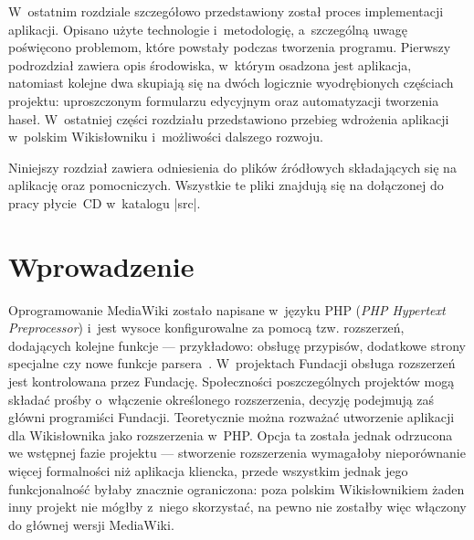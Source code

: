 \label{chap:impl}
W~ostatnim rozdziale szczegółowo przedstawiony został proces implementacji aplikacji. Opisano użyte technologie i~metodologię, a~szczególną uwagę poświęcono problemom, które powstały podczas tworzenia programu. Pierwszy podrozdział zawiera opis środowiska, w~którym osadzona jest aplikacja, natomiast kolejne dwa skupiają się na dwóch logicznie wyodrębionych częściach projektu: uproszczonym formularzu edycyjnym oraz automatyzacji tworzenia haseł. W~ostatniej części rozdziału przedstawiono przebieg wdrożenia aplikacji w~polskim Wikisłowniku i~możliwości dalszego rozwoju.

Niniejszy rozdział zawiera odniesienia do plików źródłowych składających się na aplikację oraz pomocniczych. Wszystkie te pliki znajdują się na dołączonej do pracy płycie~CD w~katalogu \kod|src|.

\section{Wprowadzenie}
Oprogramowanie MediaWiki zostało napisane w~języku PHP (\emph{PHP Hypertext Preprocessor}) i~jest wysoce konfigurowalne za pomocą tzw. rozszerzeń, dodających kolejne funkcje --- przykładowo: obsługę przypisów, dodatkowe strony specjalne czy nowe funkcje parsera~\cite{mw:extensions}. W~projektach Fundacji obsługa rozszerzeń jest kontrolowana przez Fundację. Społeczności poszczególnych projektów mogą składać prośby o~włączenie określonego rozszerzenia, decyzję podejmują zaś główni programiści Fundacji. Teoretycznie można rozważać utworzenie aplikacji dla Wikisłownika jako rozszerzenia w~PHP. Opcja ta została jednak odrzucona we wstępnej fazie projektu --- stworzenie rozszerzenia wymagałoby nieporównanie więcej formalności niż aplikacja kliencka, przede wszystkim jednak jego funkcjonalność byłaby znacznie ograniczona: poza polskim Wikisłownikiem żaden inny projekt nie mógłby z~niego skorzystać, na pewno nie zostałby więc włączony do głównej wersji MediaWiki.

